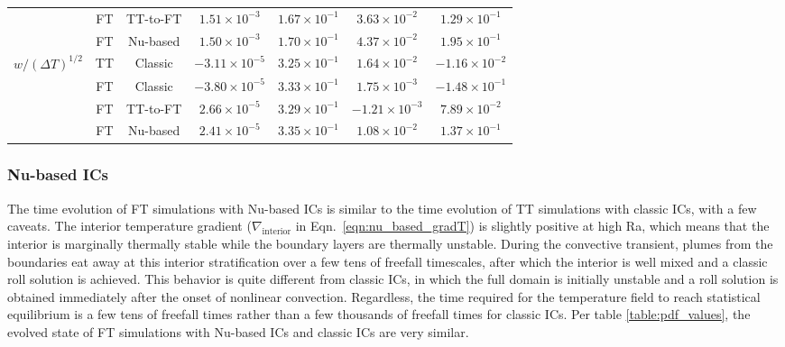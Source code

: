 \documentclass[aps, pre, onecolumn, nofootinbib, notitlepage, groupedaddress, amsfonts, amssymb, amsmath, longbibliography, superscriptaddress]{revtex4-1}
\newcommand{\grad}{\ensuremath{\nabla}}
\begin{document}
\begin{table}[t!]
\begin{center}
\begin{tabular}{c c c c c c c}
						&	FT	& TT-to-FT	&	$1.51 \times 10^{-3}$	&	$1.67 \times 10^{-1}$	&	$3.63 \times 10^{-2}$	&	$1.29  \times 10^{-1}$ \\
						&	FT	& Nu-based	&	$1.50 \times 10^{-3}$	&	$1.70 \times 10^{-1}$	&	$4.37 \times 10^{-2}$	&	$1.95  \times 10^{-1}$ \\
\hline                                                                                                                    
$w/(\Delta T)^{1/2}$ 	&	TT	& Classic	&	$-3.11 \times 10^{-5}$	&	$3.25 \times 10^{-1}$	&	$1.64 \times 10^{-2}$	&	$-1.16 \times 10^{-2}$ \\
						&	FT	& Classic	&	$-3.80 \times 10^{-5}$	&	$3.33 \times 10^{-1}$	&	$1.75 \times 10^{-3}$	&	$-1.48 \times 10^{-1}$ \\
						&	FT	& TT-to-FT	&	$2.66  \times 10^{-5}$	&	$3.29 \times 10^{-1}$	&	$-1.21 \times 10^{-3}$	&	$7.89  \times 10^{-2}$ \\
						&	FT	& Nu-based	&	$2.41  \times 10^{-5}$	&	$3.35 \times 10^{-1}$	&	$1.08 \times 10^{-2}$	&	$1.37  \times 10^{-1}$ \\
\hline																	
\end{tabular}
\end{center}
\end{table}



\subsubsection{Nu-based ICs}
The time evolution of FT simulations with Nu-based ICs is similar to the time evolution of TT simulations with classic ICs, with a few caveats.
The interior temperature gradient ($\grad_{\text{interior}}$ in Eqn.~\ref{eqn:nu_based_gradT}) is slightly positive at high Ra, which means that the interior is marginally thermally stable while the boundary layers are thermally unstable.
During the convective transient, plumes from the boundaries eat away at this interior stratification over a few tens of freefall timescales, after which the interior is well mixed and a classic roll solution is achieved.
This behavior is quite different from classic ICs, in which the full domain is initially unstable and a roll solution is obtained immediately after the onset of nonlinear convection.
Regardless, the time required for the temperature field to reach statistical equilibrium is a few tens of freefall times rather than a few thousands of freefall times for classic ICs.
Per table \ref{table:pdf_values}, the evolved state of FT simulations with Nu-based ICs and classic ICs are very similar.
\end{document}
